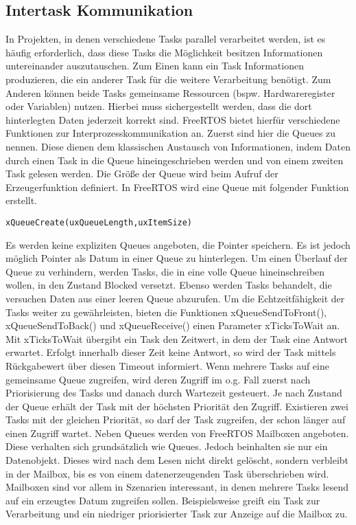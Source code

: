 \subsection{Intertask Kommunikation}
In Projekten, in denen verschiedene Tasks parallel verarbeitet werden, ist es häufig erforderlich, dass diese Tasks die Möglichkeit besitzen Informationen untereinander auszutauschen. Zum Einen kann ein Task Informationen produzieren, die ein anderer Task für die weitere Verarbeitung benötigt. Zum Anderen können beide Tasks gemeinsame Ressourcen (bspw. Hardwareregister oder Variablen) nutzen. Hierbei muss sichergestellt werden, dass die dort hinterlegten Daten jederzeit korrekt sind. FreeRTOS bietet hierfür verschiedene Funktionen zur Interprozesskommunikation an. Zuerst sind hier die Queues zu nennen. Diese dienen dem klassischen Austausch von Informationen, indem Daten durch einen Task in die Queue hineingeschrieben werden und von einem zweiten Task gelesen werden. Die Größe der Queue wird beim Aufruf der Erzeugerfunktion definiert. In FreeRTOS wird eine Queue mit folgender Funktion erstellt. 
\begin{lstlisting}[numbers = none]
xQueueCreate(uxQueueLength,uxItemSize)
\end{lstlisting}
Es werden keine expliziten Queues angeboten, die Pointer speichern. Es ist jedoch möglich Pointer als Datum in einer Queue zu hinterlegen. Um einen Überlauf der Queue zu verhindern, werden Tasks, die in eine volle Queue hineinschreiben wollen, in den Zustand Blocked versetzt. Ebenso werden Tasks behandelt, die versuchen Daten aus einer leeren Queue abzurufen. Um die Echtzeitfähigkeit der Tasks weiter zu gewährleisten, bieten die Funktionen xQueueSendToFront(), xQueueSendToBack() und xQueueReceive() einen Parameter xTicksToWait an. Mit xTicksToWait übergibt ein Task den Zeitwert, in dem der Task eine Antwort erwartet. Erfolgt innerhalb dieser Zeit keine Antwort, so wird der Task mittels Rückgabewert über diesen Timeout informiert.
Wenn mehrere Tasks auf eine gemeinsame Queue zugreifen, wird deren Zugriff im o.g. Fall zuerst nach Priorisierung des Tasks und danach durch Wartezeit gesteuert. Je nach Zustand der Queue erhält der Task mit der höchsten Priorität den Zugriff. Existieren zwei Tasks mit der gleichen Priorität, so darf der Task zugreifen, der schon länger auf einen Zugriff wartet.\newline
Neben Queues werden von FreeRTOS Mailboxen angeboten. Diese verhalten sich grund\-sätz\-lich wie Queues. Jedoch beinhalten sie nur ein Datenobjekt. Dieses wird nach dem Lesen nicht direkt gelöscht, sondern verbleibt in der Mailbox, bis es von einem datenerzeugenden Task überschrieben wird. Mailboxen sind vor allem in Szenarien interessant, in denen mehrere Tasks lesend auf ein erzeugtes Datum zugreifen sollen. Beispielsweise greift ein Task zur Verarbeitung und ein niedriger priorisierter Task zur Anzeige auf die Mailbox zu.\newline
